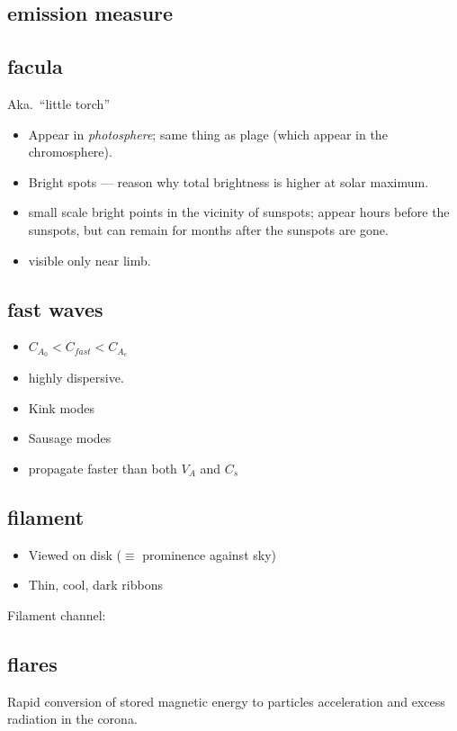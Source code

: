 \documentclass{article}
\begin{document}
\subsection{emission measure}

\subsection{facula}
Aka.\ ``little torch''
    \begin{itemize}
        \item Appear in \emph{photosphere}; same thing as plage
            (which appear in the chromosphere).
        \item Bright spots --- reason why total brightness is higher at
            solar maximum.
        \item small scale bright points in the vicinity of sunspots;
            appear hours before the sunspots, but can remain for months
            after the sunspots are gone.
        \item visible only near limb.
    \end{itemize}
\subsection{fast waves}

\begin{itemize}
    \item $C_{A_{0}} < C_{fast} < C_{A_{e}} $
    \item highly dispersive.
    \item Kink modes
    \item Sausage modes
    \item propagate faster than both $V_{A}$ and $C_{s}$
\end{itemize}

\subsection{filament}
    \begin{itemize}
        \item Viewed on disk ($\equiv$ prominence against sky)
        \item Thin, cool, dark ribbons
    \end{itemize}
    Filament channel:

\subsection{flares}
Rapid conversion of stored magnetic energy to particles acceleration and
excess radiation in the corona.
\end{document}
